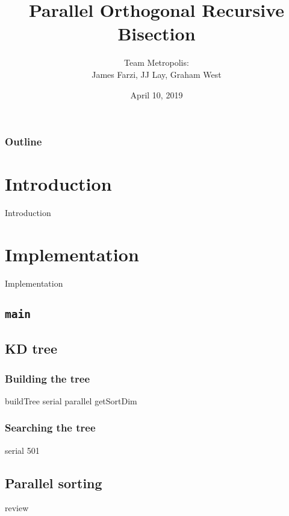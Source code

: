 \documentclass{beamer}
\title[Capstone]{Parallel Orthogonal Recursive Bisection}
\author{Team Metropolis:\\
James Farzi, JJ Lay, Graham West}
\date{April 10, 2019}
\begin{document}
\frame{\titlepage}

\begin{frame}	
	\frametitle{Outline}
	\tableofcontents
\end{frame}


\section{Introduction}

\begin{frame}	
	\begin{Huge}
		\begin{center}
			Introduction
		\end{center}
	\end{Huge}
\end{frame}


\section{Implementation}

\begin{frame}	
	\begin{Huge}
		\begin{center}
			Implementation
		\end{center}
	\end{Huge}
\end{frame}


\subsection{\texttt{main}}


\subsection{KD tree}

\subsubsection{Building the tree}
buildTree
serial
parallel
getSortDim


\subsubsection{Searching the tree}
serial
501


\subsection{Parallel sorting}
review
\end{document}
